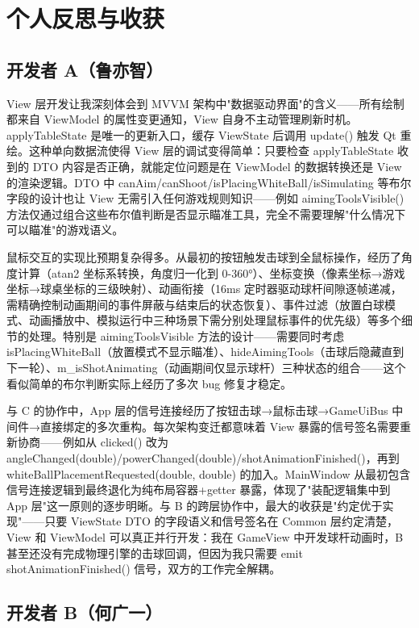 \documentclass[11pt]{ctexart}
\begin{document}
\section{个人反思与收获}

\subsection{开发者 A（鲁亦智）}

View 层开发让我深刻体会到 MVVM 架构中"数据驱动界面"的含义——所有绘制都来自 ViewModel 的属性变更通知，View 自身不主动管理刷新时机。applyTableState 是唯一的更新入口，缓存 ViewState 后调用 update() 触发 Qt 重绘。这种单向数据流使得 View 层的调试变得简单：只要检查 applyTableState 收到的 DTO 内容是否正确，就能定位问题是在 ViewModel 的数据转换还是 View 的渲染逻辑。DTO 中 canAim/canShoot/isPlacingWhiteBall/isSimulating 等布尔字段的设计也让 View 无需引入任何游戏规则知识——例如 aimingToolsVisible() 方法仅通过组合这些布尔值判断是否显示瞄准工具，完全不需要理解"什么情况下可以瞄准"的游戏语义。

鼠标交互的实现比预期复杂得多。从最初的按钮触发击球到全鼠标操作，经历了角度计算（atan2 坐标系转换，角度归一化到 0-360°）、坐标变换（像素坐标→游戏坐标→球桌坐标的三级映射）、动画衔接（16ms 定时器驱动球杆间隙逐帧递减，需精确控制动画期间的事件屏蔽与结束后的状态恢复）、事件过滤（放置白球模式、动画播放中、模拟运行中三种场景下需分别处理鼠标事件的优先级）等多个细节的处理。特别是 aimingToolsVisible 方法的设计——需要同时考虑 isPlacingWhiteBall（放置模式不显示瞄准）、hideAimingTools（击球后隐藏直到下一轮）、m\_isShotAnimating（动画期间仅显示球杆）三种状态的组合——这个看似简单的布尔判断实际上经历了多次 bug 修复才稳定。

与 C 的协作中，App 层的信号连接经历了按钮击球→鼠标击球→GameUiBus 中间件→直接绑定的多次重构。每次架构变迁都意味着 View 暴露的信号签名需要重新协商——例如从 clicked() 改为 angleChanged(double)/powerChanged(double)/shotAnimationFinished()，再到 whiteBallPlacementRequested(double, double) 的加入。MainWindow 从最初包含信号连接逻辑到最终退化为纯布局容器+getter 暴露，体现了"装配逻辑集中到 App 层"这一原则的逐步明晰。与 B 的跨层协作中，最大的收获是"约定优于实现"——只要 ViewState DTO 的字段语义和信号签名在 Common 层约定清楚，View 和 ViewModel 可以真正并行开发：我在 GameView 中开发球杆动画时，B 甚至还没有完成物理引擎的击球回调，但因为我只需要 emit shotAnimationFinished() 信号，双方的工作完全解耦。

\subsection{开发者 B（何广一）}
\end{document}
